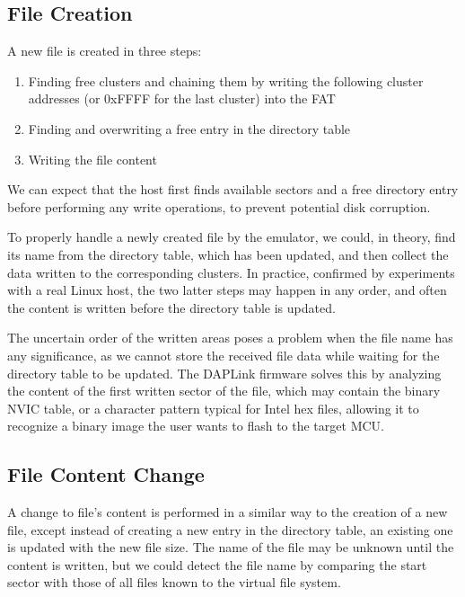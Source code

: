 \subsection{File Creation}

A new file is created in three steps:

\begin{enumerate}
	\item Finding free clusters and chaining them by writing the following cluster addresses (or 0xFFFF for the last cluster) into the \gls{FAT}
	\item Finding and overwriting a free entry in the directory table
	\item Writing the file content
\end{enumerate}

We can expect that the host first finds available sectors and a free directory entry before performing any write operations, to prevent potential disk corruption.

To properly handle a newly created file by the emulator, we could, in theory, find its name from the directory table, which has been updated, and then collect the data written to the corresponding clusters. In practice, confirmed by experiments with a real Linux host, the two latter steps may happen in any order, and often the content is written before the directory table is updated.

The uncertain order of the written areas poses a problem when the file name has any significance, as we cannot store the received file data while waiting for the directory table to be updated. The \arm DAPLink firmware solves this by analyzing the content of the first written sector of the file, which may contain the binary \gls{NVIC} table, or a character pattern typical for Intel hex files, allowing it to recognize a binary image the user wants to flash to the target \gls{MCU}.

\subsection{File Content Change}

A change to file's content is performed in a similar way to the creation of a new file, except instead of creating a new entry in the directory table, an existing one is updated with the new file size. The name of the file may be unknown until the content is written, but we could detect the file name by comparing the start sector with those of all files known to the virtual file system.

